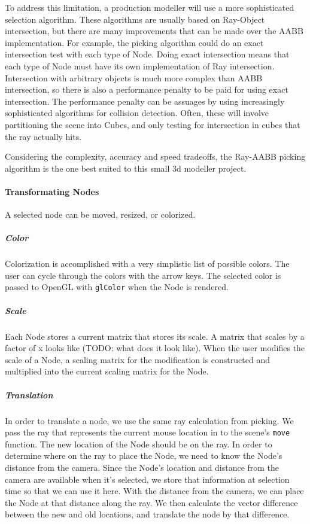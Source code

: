 \documentclass[11pt,draft]{article}
\begin{document}
To address this limitation, a production modeller will use a more sophisticated selection algorithm. These algorithms are usually based on Ray-Object intersection, but there are many improvements that
can be made over the AABB implementation. For example, the picking algorithm could do an exact intersection test with each type of Node. Doing exact intersection means that each type of Node must have its own
implementation of Ray intersection. Intersection with arbitrary objects is much more complex than AABB intersection, so there is also a performance penalty to be paid for using exact intersection. The performance
penalty can be assuages by using increasingly sophisticated algorithms for collision detection. Often, these will involve partitioning the scene into Cubes, and only testing for intersection in cubes that the ray
actually hits.

Considering the complexity, accuracy and speed tradeoffs, the Ray-AABB picking algorithm is the one best suited to this small 3d modeller project.

\paragraph{Transformating Nodes}
A selected node can be moved, resized, or colorized.

\subparagraph{Color}
Colorization is accomplished with a very simplistic list of possible colors. The user can cycle through the colors with the arrow keys. The selected
color is passed to OpenGL with \lstinline$glColor$ when the Node is rendered.

\subparagraph{Scale}
Each Node stores a current matrix that stores its scale. A matrix that scales by a factor of x looks like (TODO: what does it look like). When the
user modifies the scale of a Node, a scaling matrix for the modification is constructed and multiplied into the current scaling matrix for
the Node.

\subparagraph{Translation}
In order to translate a node, we use the same ray calculation from picking. We pass the ray that represents the current mouse location in to the scene's
\lstinline$move$ function. The new location of the Node should be on the ray.
In order to determine where on the ray to place the Node, we need to know the Node's distance from the camera. Since the Node's location and distance
from the camera are available when it's selected, we store that information at selection time so that we can use it here.
With the distance from the camera, we can place the Node at that distance along the ray. We then calculate the vector difference between the new and old
locations, and translate the node by that difference.
\end{document}
